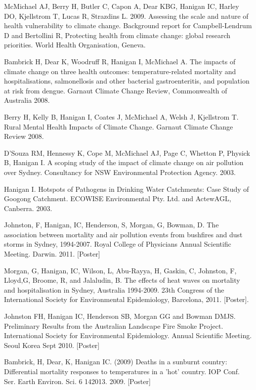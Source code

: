 \documentclass[a4paper,11pt]{article}
\begin{document}
\ind McMichael AJ, Berry H, Butler C, Capon A, Dear KBG, Hanigan IC, Harley DO, Kjellstrom T, Lucas R, Strazdins L. 2009. Assessing the scale and nature of health vulnerability to climate change.  Background report for Campbell-Lendrum D and Bertollini R, Protecting health from climate change: global research priorities.  World Health Organisation, Geneva.

\ind Bambrick H, Dear K, Woodruff R, Hanigan I, McMichael A.  The impacts of climate change on three health outcomes: temperature-related mortality and hospitalisations, salmonellosis and other bacterial gastroenteritis, and population at risk from dengue.  Garnaut Climate Change Review, Commonwealth of Australia 2008.

\ind Berry H, Kelly B, Hanigan I, Coates J, McMichael A, Welsh J, Kjellstrom T. Rural Mental Health Impacts of Climate Change. Garnaut Climate Change Review 2008.

\ind D’Souza RM, Hennessy K, Cope M, McMichael AJ, Page C, Whetton P, Physick B, Hanigan I. A scoping study of the impact of climate change on air pollution over Sydney. Consultancy for NSW Environmental Protection Agency. 2003.

\ind Hanigan I.  Hotspots of Pathogens in Drinking Water Catchments: Case Study of Googong Catchment.  ECOWISE Environmental Pty. Ltd. and ActewAGL, Canberra. 2003.

 \bigskip

\medskip
{}
\medskip
\ind Johnston, F, Hanigan, IC, Henderson, S, Morgan, G, Bowman, D. The association between mortality and air pollution events from bushfires and dust storms in Sydney, 1994-2007. Royal College of Physicians Annual Scientific Meeting. Darwin.  2011. [Poster]

\ind Morgan, G, Hanigan, IC, Wilson, L, Abu-Rayya, H, Gaskin, C, Johnston, F, Lloyd,G, Broome, R, and Jalaludin, B. The effects of heat waves on mortality and hospitalisation in Sydney, Australia 1994-2009. 23th Congress of the International Society for Environmental Epidemiology, Barcelona, 2011. [Poster].

\ind Johnston FH, Hanigan IC, Henderson SB, Morgan GG and Bowman DMJS. Preliminary Results from the Australian Landscape Fire Smoke Project. International Society for Environmental Epidemiology. Annual Scientific Meeting. Seoul Korea Sept 2010. [Poster]

\ind Bambrick, H, Dear, K, Hanigan IC. (2009) Deaths in a sunburnt country: Differential mortality responses to temperatures in a 'hot' country. IOP Conf. Ser. Earth Environ. Sci. 6 142013. 2009. [Poster]
\end{document}

